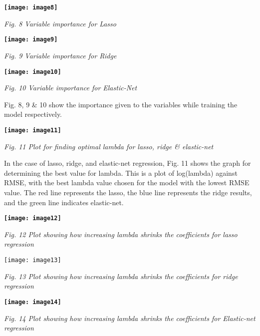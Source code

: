 \documentclass{article} %
\begin{document}
\noindent \textbf{}

\noindent \textbf{}

\noindent \textbf{\texttt{[image: image8]}}

\noindent \textit{Fig. 8 Variable importance for Lasso}

\noindent \textbf{\texttt{[image: image9]}}

\noindent \textit{Fig. 9 Variable importance for Ridge}

\noindent \textbf{\texttt{[image: image10]}}

\noindent \textit{Fig. 10 Variable importance for Elastic-Net}

\noindent Fig. 8, 9 \& 10 show the importance given to the variables while training the model respectively.

\noindent \textbf{\texttt{[image: image11]}}

\noindent \textit{Fig. 11 Plot for finding optimal lambda for lasso, ridge \& elastic-net}

\noindent In the case of lasso, ridge, and elastic-net regression, Fig. 11 shows the graph for determining the best value for lambda. This is a plot of log(lambda) against RMSE, with the best lambda value chosen for the model with the lowest RMSE value. The red line represents the lasso, the blue line represents the ridge results, and the green line indicates elastic-net.

\noindent 

\noindent \textbf{\texttt{[image: image12]}}

\noindent \textit{Fig. 12 Plot showing how increasing lambda shrinks the coefficients for lasso regression}

\noindent 

\noindent \texttt{[image: image13]}\textbf{}

\noindent \textit{Fig. 13 Plot showing how increasing lambda shrinks the coefficients for ridge regression}

\noindent \textbf{\texttt{[image: image14]}}

\noindent \textit{Fig. 14 Plot showing how increasing lambda shrinks the coefficients for Elastic-net regression}
\end{document}
